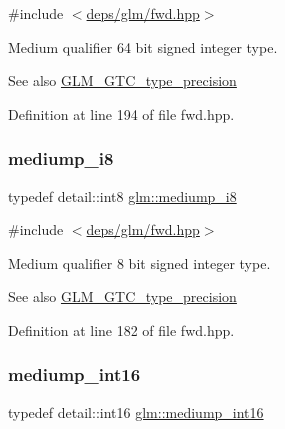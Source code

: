 {\ttfamily \#include $<$\hyperlink{fwd_8hpp}{deps/glm/fwd.\+hpp}$>$}

Medium qualifier 64 bit signed integer type. \begin{DoxySeeAlso}{See also}
\hyperlink{group__gtc__type__precision}{G\+L\+M\+\_\+\+G\+T\+C\+\_\+type\+\_\+precision} 
\end{DoxySeeAlso}


Definition at line 194 of file fwd.\+hpp.

\mbox{\label{group__gtc__type__precision_ga28a8b5fd51072680bb55178c17cc7411}} 
\subsubsection{\texorpdfstring{mediump\+\_\+i8}{mediump\_i8}}
{\footnotesize\ttfamily typedef detail\+::int8 \hyperlink{group__gtc__type__precision_ga28a8b5fd51072680bb55178c17cc7411}{glm\+::mediump\+\_\+i8}}



{\ttfamily \#include $<$\hyperlink{fwd_8hpp}{deps/glm/fwd.\+hpp}$>$}

Medium qualifier 8 bit signed integer type. \begin{DoxySeeAlso}{See also}
\hyperlink{group__gtc__type__precision}{G\+L\+M\+\_\+\+G\+T\+C\+\_\+type\+\_\+precision} 
\end{DoxySeeAlso}


Definition at line 182 of file fwd.\+hpp.

\mbox{\label{group__gtc__type__precision_ga4611997edb6c61606daa11990cf08798}} 
\subsubsection{\texorpdfstring{mediump\+\_\+int16}{mediump\_int16}}
{\footnotesize\ttfamily typedef detail\+::int16 \hyperlink{group__gtc__type__precision_ga4611997edb6c61606daa11990cf08798}{glm\+::mediump\+\_\+int16}}




